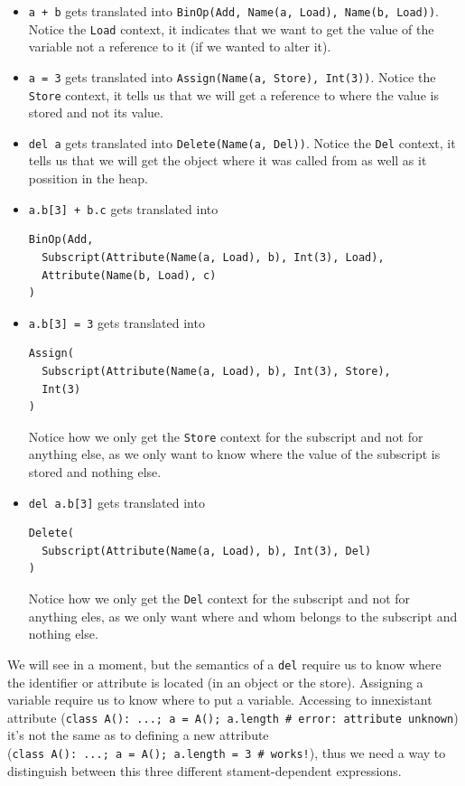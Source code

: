 \documentclass[
11pt, %
english, %
singlespacing, %
headsepline, %
]{MastersDoctoralThesis} %
\begin{document}
\begin{itemize}
\item
  \texttt{a\ +\ b} gets translated into
  \texttt{BinOp(Add,\ Name(a,\ Load),\ Name(b,\ Load))}. Notice the
  \texttt{Load} context, it indicates that we want to get the value of
  the variable not a reference to it (if we wanted to alter it).
\item
  \texttt{a\ =\ 3} gets translated into
  \texttt{Assign(Name(a,\ Store),\ Int(3))}. Notice the \texttt{Store}
  context, it tells us that we will get a reference to where the value
  is stored and not its value.
\item
  \texttt{del\ a} gets translated into \texttt{Delete(Name(a,\ Del))}.
  Notice the \texttt{Del} context, it tells us that we will get the
  object where it was called from as well as it possition in the heap.
\item
  \texttt{a.b{[}3{]}\ +\ b.c} gets translated into

\begin{verbatim}
BinOp(Add,
  Subscript(Attribute(Name(a, Load), b), Int(3), Load),
  Attribute(Name(b, Load), c)
)
\end{verbatim}
\item
  \texttt{a.b{[}3{]}\ =\ 3} gets translated into

\begin{verbatim}
Assign(
  Subscript(Attribute(Name(a, Load), b), Int(3), Store),
  Int(3)
)
\end{verbatim}

  Notice how we only get the \texttt{Store} context for the subscript
  and not for anything else, as we only want to know where the value of
  the subscript is stored and nothing else.
\item
  \texttt{del\ a.b{[}3{]}} gets translated into

\begin{verbatim}
Delete(
  Subscript(Attribute(Name(a, Load), b), Int(3), Del)
)
\end{verbatim}

  Notice how we only get the \texttt{Del} context for the subscript and
  not for anything eles, as we only want where and whom belongs to the
  subscript and nothing else.
\end{itemize}

We will see in a moment, but the semantics of a \texttt{del} require us
to know where the identifier or attribute is located (in an object or
the store). Assigning a variable require us to know where to put a
variable. Accessing to innexistant attribute
(\texttt{class\ A():\ ...;\ a\ =\ A();\ a.length\ \#\ error:\ attribute\ unknown})
it's not the same as to defining a new attribute
(\texttt{class\ A():\ ...;\ a\ =\ A();\ a.length\ =\ 3\ \#\ works!}),
thus we need a way to distinguish between this three different
stament-dependent expressions.
\end{document}
